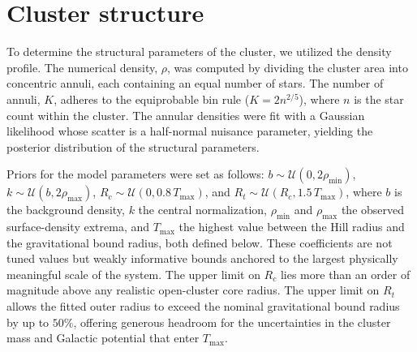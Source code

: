 \documentclass{aa}
\begin{document}
\section{Cluster structure}\label{subsec:structural}
To determine the structural parameters of the cluster, we utilized the \citet{1962AJ.....67..471K} density profile. The numerical density, $\rho$, was computed by dividing the cluster area into concentric annuli, each containing an equal number of stars. The number of annuli, $K$, adheres to the equiprobable bin rule ($K = 2n^{2/5}$), where $n$ is the star count within the cluster. The annular densities were fit with a Gaussian likelihood whose scatter is a half-normal nuisance parameter, yielding the posterior distribution of the structural parameters.

Priors for the model parameters were set as follows: $b \sim \mathcal{U}(0, 2\rho_{\mathrm{min}})$, $k \sim \mathcal{U}(b, 2\rho_{\mathrm{max}})$, $R_c \sim \mathcal{U}(0, 0.8\,T_{\mathrm{max}})$, and $R_t \sim \mathcal{U}(R_c, 1.5\,T_{\mathrm{max}})$, where $b$ is the background density, $k$ the central normalization, $\rho_{\mathrm{min}}$ and $\rho_{\mathrm{max}}$ the observed surface-density extrema, and $T_{\mathrm{max}}$ the highest value between the Hill radius and the gravitational bound radius, both defined below. These coefficients are not tuned values but weakly informative bounds anchored to the largest physically meaningful scale of the system. The upper limit on $R_c$ lies more than an order of magnitude above any realistic open-cluster core radius. The upper limit on $R_t$ allows the fitted outer radius to exceed the nominal gravitational bound radius by up to $50\%$, offering generous headroom for the uncertainties in the cluster mass and Galactic potential that enter $T_{\mathrm{max}}$.
\end{document}
